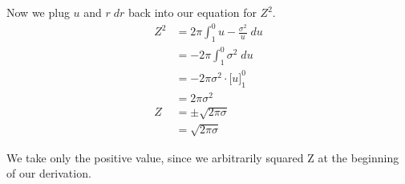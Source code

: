 \documentclass{article}
\begin{document}
Now we plug $u$ and $r \; dr$ back into our equation for $Z^2$.
\begin{align*}
  Z^2 &= 2\pi \int_1^0{u -\frac{\sigma^{2}}{u}} \; du \\
  &= -2\pi \int_1^0{\sigma^{2}} \; du \\
  &= -2\pi \sigma^{2} \cdot \Big[ u \Big]_1^0 \\
  &= 2\pi \sigma^{2} \\
  Z &= \pm \sqrt{2\pi\sigma} \\
  &= \sqrt{2\pi\sigma}
\end{align*}

We take only the positive value, since we arbitrarily squared Z at the
beginning of our derivation.
\end{document}
